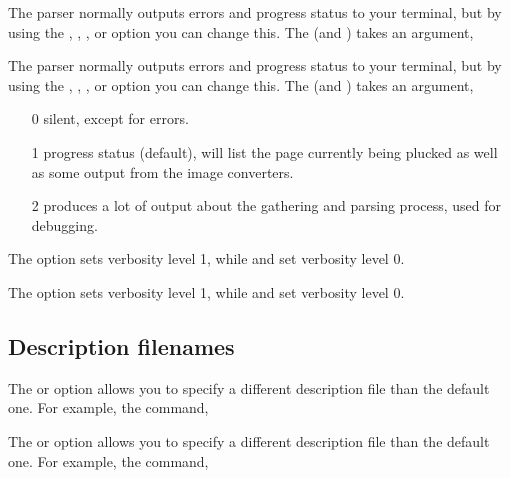 \begin{latexonly}
The parser normally outputs errors and progress status to your terminal,
but by using the , ,
,  or
 option you can change this. The 
(and ) takes an argument,
\end{latexonly}
\begin{htmlonly}
The parser normally outputs errors and progress status to your terminal,
but by using the , ,
,  or
 option you can change this. The 
(and ) takes an argument,
\end{htmlonly}

\begin{enumerate}
\item[0] silent, except for errors.
\item[1] progress status (default), will list the page currently being plucked
as well as some output from the image converters.
\item[2] produces a lot of output about the gathering and parsing process,
used for debugging.
\end{enumerate}

\begin{latexonly}
The  option sets verbosity level 1, while  and
 set verbosity level 0.
\end{latexonly}
\begin{htmlonly}
The  option sets verbosity level 1, while  and
 set verbosity level 0.
\end{htmlonly}

\subsection{Description filenames}

\begin{latexonly}
The  or  
option allows you to specify a different description file than the 
default one. For example, the command,
\end{latexonly}
\begin{htmlonly}
The  or  
option allows you to specify a different description file than the 
default one. For example, the command,
\end{htmlonly}\\

